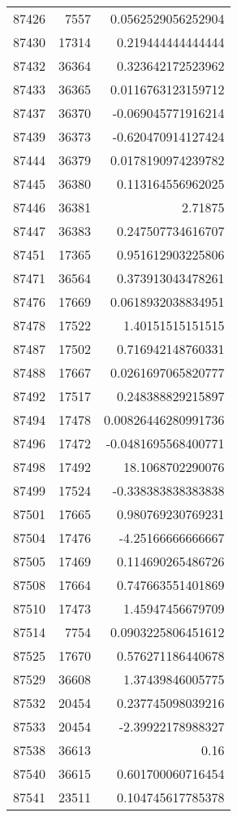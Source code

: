 \begin{tabular}{r | r | r}
87426 & 7557 & 0.0562529056252904 \\
87430 & 17314 & 0.219444444444444 \\
87432 & 36364 & 0.323642172523962 \\
87433 & 36365 & 0.0116763123159712 \\
87437 & 36370 & -0.069045771916214 \\
87439 & 36373 & -0.620470914127424 \\
87444 & 36379 & 0.0178190974239782 \\
87445 & 36380 & 0.113164556962025 \\
87446 & 36381 & 2.71875 \\
87447 & 36383 & 0.247507734616707 \\
87451 & 17365 & 0.951612903225806 \\
87471 & 36564 & 0.373913043478261 \\
87476 & 17669 & 0.0618932038834951 \\
87478 & 17522 & 1.40151515151515 \\
87487 & 17502 & 0.716942148760331 \\
87488 & 17667 & 0.0261697065820777 \\
87492 & 17517 & 0.248388829215897 \\
87494 & 17478 & 0.00826446280991736 \\
87496 & 17472 & -0.0481695568400771 \\
87498 & 17492 & 18.1068702290076 \\
87499 & 17524 & -0.338383838383838 \\
87501 & 17665 & 0.980769230769231 \\
87504 & 17476 & -4.25166666666667 \\
87505 & 17469 & 0.114690265486726 \\
87508 & 17664 & 0.747663551401869 \\
87510 & 17473 & 1.45947456679709 \\
87514 & 7754 & 0.0903225806451612 \\
87525 & 17670 & 0.576271186440678 \\
87529 & 36608 & 1.37439846005775 \\
87532 & 20454 & 0.237745098039216 \\
87533 & 20454 & -2.39922178988327 \\
87538 & 36613 & 0.16 \\
87540 & 36615 & 0.601700060716454 \\
87541 & 23511 & 0.104745617785378 \\

\end{tabular}
